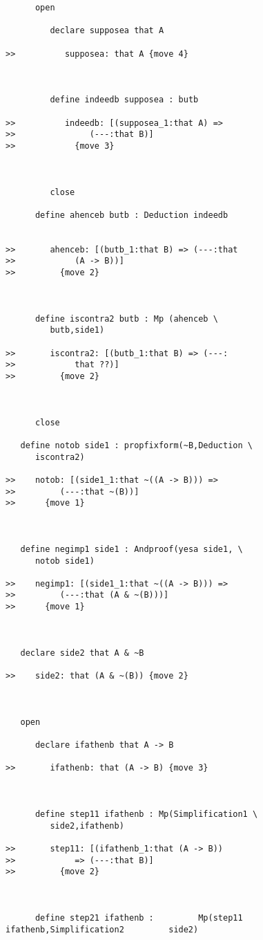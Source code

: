 \documentclass[12pt]{article}
\begin{document}
\begin{verbatim}
      open

         declare supposea that A

>>          supposea: that A {move 4}



         define indeedb supposea : butb

>>          indeedb: [(supposea_1:that A) =>
>>               (---:that B)]
>>            {move 3}



         close

      define ahenceb butb : Deduction indeedb


>>       ahenceb: [(butb_1:that B) => (---:that
>>            (A -> B))]
>>         {move 2}



      define iscontra2 butb : Mp (ahenceb \
         butb,side1)

>>       iscontra2: [(butb_1:that B) => (---:
>>            that ??)]
>>         {move 2}



      close

   define notob side1 : propfixform(~B,Deduction \
      iscontra2)

>>    notob: [(side1_1:that ~((A -> B))) =>
>>         (---:that ~(B))]
>>      {move 1}



   define negimp1 side1 : Andproof(yesa side1, \
      notob side1)

>>    negimp1: [(side1_1:that ~((A -> B))) =>
>>         (---:that (A & ~(B)))]
>>      {move 1}



   declare side2 that A & ~B

>>    side2: that (A & ~(B)) {move 2}



   open

      declare ifathenb that A -> B

>>       ifathenb: that (A -> B) {move 3}



      define step11 ifathenb : Mp(Simplification1 \
         side2,ifathenb)

>>       step11: [(ifathenb_1:that (A -> B))
>>            => (---:that B)]
>>         {move 2}



      define step21 ifathenb :         Mp(step11 ifathenb,Simplification2         side2)


\end{verbatim}
\end{document}

